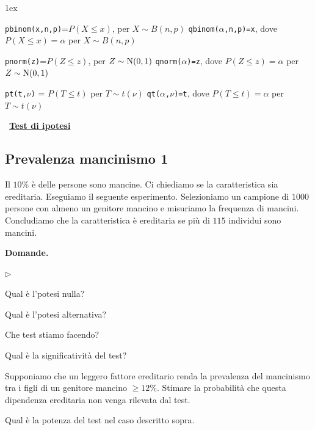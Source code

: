 \documentclass[11pt,openany]{book}
\newcommand{\mylabel}[1]{{\footnotesize\textsf{#1}}\hfill}
\renewenvironment{itemize}
  {\begin{list}{$\triangleright$}{%
   \setlength{\parskip}{0mm}
   \setlength{\topsep}{.2\baselineskip}
   \setlength{\rightmargin}{0mm}
   \setlength{\listparindent}{0mm}
   \setlength{\itemindent}{0mm}
   \setlength{\labelwidth}{3ex}
   \setlength{\itemsep}{.4\baselineskip}
   \setlength{\parsep}{0mm}
   \setlength{\partopsep}{0mm}
   \setlength{\labelsep}{1ex}
   \setlength{\leftmargin}{\labelwidth+\labelsep}
   \let\makelabel\mylabel}}{%
   \end{list}\vspace*{-1.3mm}}
\begin{document}
\vfill
\parskip1ex
{\hrulefill\scriptsize

{\tt pbinom(x,n,p)}=$P(X\le x)$, per $X\sim B(n,p)$
\hfill 
{\tt qbinom($\alpha$,n,p)=x},  dove $P(X\le x)=\alpha$ per $X\sim B(n,p)$

{\tt pnorm(z)}=$P(Z\le z)$, per $Z\sim {\rm N}(0,1)$
\hfill 
{\tt qnorm($\alpha$)=z},  dove $P(Z\le z)=\alpha$ per $Z\sim {\rm N}(0,1)$

{\tt pt(t,$\nu$)} = $P(T\le t)$ per $T\sim t(\nu)$
\hfill
{\tt qt($\alpha$,$\nu$)=t}, dove $P(T\le t)=\alpha$ per $T\sim t(\nu)$

}

\clearpage\
\hfill\textbf{{\color{brown}\hyperref[test_ipotesi]{Test di ipotesi \faShare}}}
\subsection{Prevalenza mancinismo 1}
\label{Prevalenza mancinismo 1}

Il $10\%$ è delle persone sono mancine. Ci chiediamo se la caratteristica sia ereditaria. Eseguiamo il seguente esperimento. Selezioniamo un campione di $1000$ persone con almeno un genitore mancino e misuriamo la frequenza di mancini. Concludiamo che la caratteristica \`e ereditaria se pi\`u di $115$ individui sono mancini.

\textbf{Domande.}

\begin{itemize}
\item[1.] Qual è l'potesi nulla?

\item[2.] Qual è l'potesi alternativa?

\item[3.] Che test stiamo facendo?

\item[4.] Qual è la significatività del test?

\item[5.] Supponiamo che un leggero fattore ereditario renda la prevalenza del mancinismo tra i figli di un genitore mancino $\ge12\%$. Stimare la probabilità che questa dipendenza ereditaria non venga rilevata dal test. 

\item[6.] Qual è la potenza del test nel caso descritto sopra.
\end{itemize}
\end{document}

